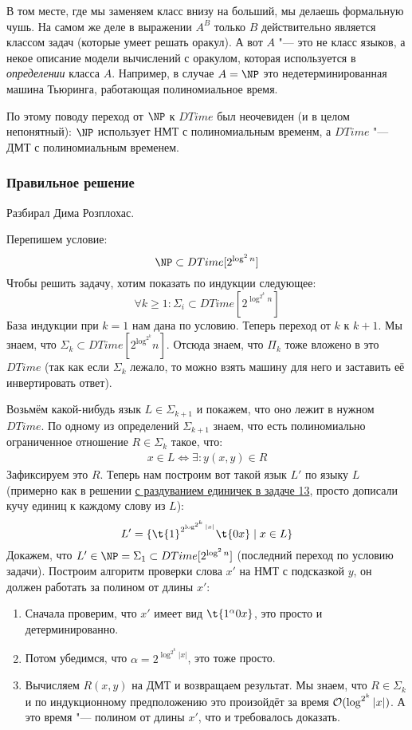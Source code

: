 		\begin{Rem}
			В том месте, где мы заменяем класс внизу на больший, мы делаешь формальную чушь.
			На самом же деле в выражении $A^B$ только $B$ действительно является классом задач
			(которые умеет решать оракул).
			А вот $A$ "--- это не класс языков, а некое описание модели вычислений с оракулом,
			которая используется в \textit{определении} класса $A$.
			Например, в случае $A=\NP$ это недетерминированная машина Тьюринга, работающая полиномиальное время.

			По этому поводу переход от $\NP$ к $DTime$ был неочевиден (и в целом непонятный): $\NP$
			использует НМТ с полиномиальным временм, а $DTime$ "--- ДМТ с полиномиальным временем.
		\end{Rem}

	\subsubsection{Правильное решение}
		Разбирал Дима Розплохас.

		Перепишем условие:
		\[ \NP \subset DTime[2^{\log^2 n}] \]
		Чтобы решить задачу, хотим показать по индукции следующее:
		\[ \forall k \ge 1 \colon \Sigma_i \subset DTime[2^{\log^{2^k} n}] \]
		База индукции при $k=1$ нам дана по условию.
		Теперь переход от $k$ к $k+1$.
		Мы знаем, что $\Sigma_k \subset DTime[2^{\log^{2^k}} n]$.
		Отсюда знаем, что $\Pi_k$ тоже вложено в это $DTime$
		(так как если $\Sigma_k$ лежало, то можно взять машину для него и заставить её инвертировать ответ).

		Возьмём какой-нибудь язык $L \in \Sigma_{k+1}$ и покажем, что оно лежит в нужном $DTime$.
		По одному из определений $\Sigma_{k+1}$ знаем, что есть полиномиально ограниченное отношение
		$R \in \Sigma_k$ такое, что:
		\begin{gather*}
			x \in L \iff \exists \colon y (x, y) \in R
		\end{gather*}
		Зафиксируем это $R$.
		Теперь нам построим вот такой язык $L'$ по языку $L$ (примерно как в решении
		\hyperref[prob13_sol2]{с раздуванием единичек в задаче 13}, просто дописали кучу единиц к
		каждому слову из $L$):
		\[
			L' = \{
				\t{1}^{2^{\log^{2^k} |x|}}
				\t{0x}
				\mid
				x \in L
			\}
		\]
		Докажем, что $L' \in \NP = \Sigma_1 \subset DTime[2^{\log^2 n}]$ (последний переход по условию задачи).
		Построим алгоритм проверки слова $x'$ на НМТ с подсказкой $y$, он должен работать за полином
		от длины $x'$:
		\begin{enumerate}
			\item Сначала проверим, что $x'$ имеет вид $\t{1^\alpha 0 x}$, это просто и детерминированно.
			\item Потом убедимся, что $\alpha = 2^{\log^{2^k} |x|}$, это тоже просто.
			\item
				Вычисляем $R(x, y)$ на ДМТ и возвращаем результат.
				Мы знаем, что $R \in \Sigma_k$ и по индукционному предположению это произойдёт за время $\mathcal O(\log^{2^k} |x|)$.
				А это время "--- полином от длины $x'$, что и требовалось доказать.
		\end{enumerate}

